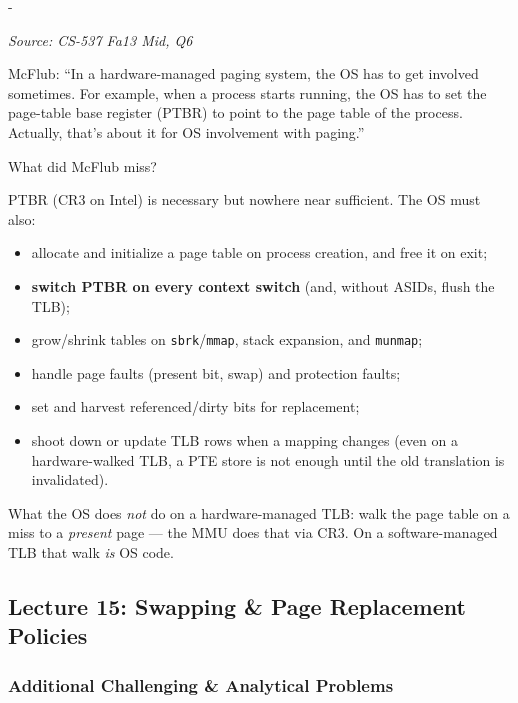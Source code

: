 \documentclass[11pt,a4paper]{article}
\makeatletter
\newcommand{\keepspace}[1]{\par\penalty-100\begingroup
  \setlength{\dimen@}{#1}\dimen@ii\pagegoal\advance\dimen@ii-\pagetotal
  \ifdim\dimen@>\dimen@ii\ifdim\dimen@ii>\z@\vfil\fi\break\fi\endgroup}
\newcounter{qn}[section]
\newenvironment{Qn}[4]{%
  \refstepcounter{qn}\keepspace{7\baselineskip}%
  \begin{tcolorbox}[qboxstyle, title={Q\thesection.\theqn\ \ [#1 \textbar\ #2]\ \ #4}]%
  {\footnotesize\color{g3}\textit{Source: #3}}\par\smallskip%
}{%
  \end{tcolorbox}%
}
\newenvironment{Sol}{%
  \begin{tcolorbox}[sboxstyle, title={Solution}]%
}{%
  \end{tcolorbox}\vspace{0.35em}%
}
\makeatother
\begin{document}
\begin{Qn}{Easy-Medium}{Lect 13}{CS-537 Fa13 Mid, Q6}{OS involvement in a hardware-managed paging system}
McFlub: ``In a hardware-managed paging system, the OS has to get
involved sometimes. For example, when a process starts running, the OS
has to set the page-table base register (PTBR) to point to the page
table of the process. Actually, that's about it for OS involvement with
paging.''

What did McFlub miss?
\end{Qn}
\begin{Sol}
PTBR (CR3 on Intel) is necessary but nowhere near sufficient. The OS
must also:
\begin{itemize}
\item allocate and initialize a page table on process creation, and
      free it on exit;
\item \textbf{switch PTBR on every context switch} (and, without ASIDs,
      flush the TLB);
\item grow/shrink tables on \texttt{sbrk}/\texttt{mmap}, stack
      expansion, and \texttt{munmap};
\item handle page faults (present bit, swap) and protection faults;
\item set and harvest referenced/dirty bits for replacement;
\item shoot down or update TLB rows when a mapping changes (even on a
      hardware-walked TLB, a PTE store is not enough until the old
      translation is invalidated).
\end{itemize}
What the OS does \emph{not} do on a hardware-managed TLB: walk the
page table on a miss to a \emph{present} page --- the MMU does that via
CR3. On a software-managed TLB that walk \emph{is} OS code.
\end{Sol}

\subsection{Lecture 15: Swapping \& Page Replacement Policies}

\subsubsection*{Additional Challenging \& Analytical Problems}
\end{document}
